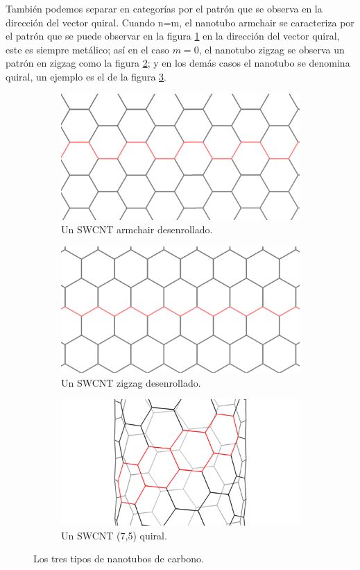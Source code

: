 También podemos separar en categorías por el patrón que se observa en la dirección del vector quiral. Cuando n=m, el nanotubo armchair se caracteriza por el patrón que se puede observar en la figura \ref{fig:armchair} en la dirección del vector quiral, este es siempre metálico; así en el caso $m=0$, el nanotubo zigzag se observa un patrón en zigzag como la figura \ref{fig:zigzag}; y en los demás casos el nanotubo se denomina quiral, un ejemplo es el de la figura \ref{fig:quiral}.

\begin{figure}[!hbt]
\begin{subfigure}{.5\textwidth}
  \centering
  \includegraphics[width=.8\linewidth]{armchair.png}  
  \caption{Un SWCNT armchair desenrollado.}
  \label{fig:armchair}
\end{subfigure}
\begin{subfigure}{.5\textwidth}
  \centering
  \includegraphics[width=.8\linewidth]{zigzag.png}  
  \caption{Un SWCNT zigzag desenrollado.}
  \label{fig:zigzag}
\end{subfigure}
\begin{subfigure}{1\textwidth}
  \centering
  \includegraphics[width=.5\linewidth]{quiral.png}  
  \caption{Un SWCNT (7,5) quiral.}
  \label{fig:quiral}
\end{subfigure}
\caption{Los tres tipos de nanotubos de carbono.}
\label{fig:CNTsbygeometry}
\end{figure}

